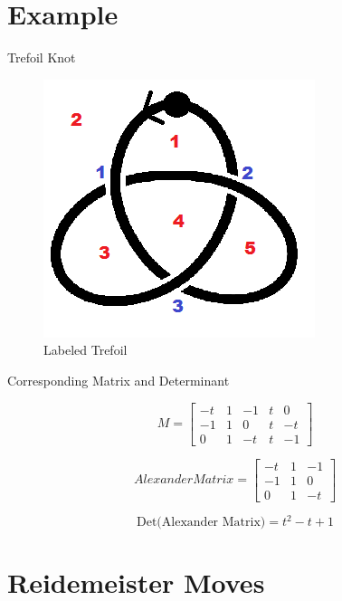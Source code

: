\documentclass[10pt]{beamer}
\begin{document}
\section{Example}

\begin{frame}[fragile]{Trefoil Knot}
	\begin{figure}
    \includegraphics[scale=0.5]{Labeled_Trefoil_2}
    \caption{Labeled Trefoil}
    \end{figure}
\end{frame}

\begin{frame}{Corresponding Matrix and Determinant}
	\begin{figure}
    \centering
    \[
    M=
    \begin{bmatrix}
    -t & 1 & -1& t & 0\\
    -1 & 1 & 0 & t & -t\\
    0 & 1 & -t & t & -1
    \end{bmatrix}
    \]
    \end{figure}
    \pause
    \begin{figure}
    \centering
    \[
    Alexander Matrix=
    \begin{bmatrix}
    -t & 1 & -1\\
    -1 & 1 & 0\\
    0 & 1 & -t
    \end{bmatrix}
    \]
    \end{figure}
    \pause
   $$ \text{Det(Alexander Matrix)} = t^2 - t + 1 $$
\end{frame}

\section{Reidemeister Moves}
\end{document}
